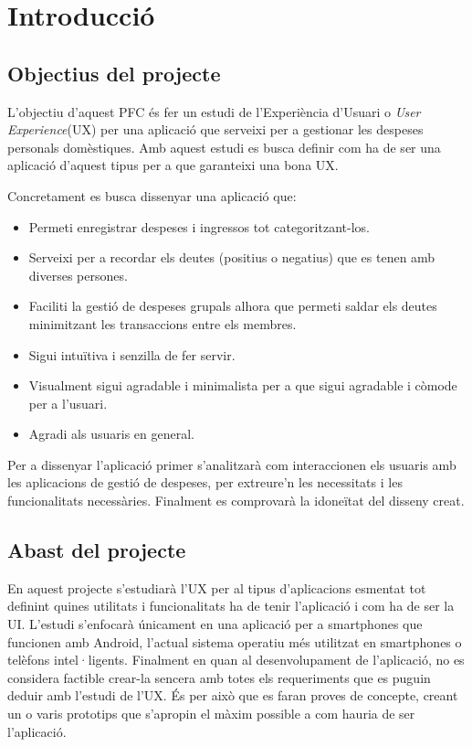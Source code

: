\chapter{Introducció}

\section{Objectius del projecte}
L'objectiu d'aquest \ac{PFC} és fer un estudi de l'Experiència d'Usuari o \textit{User Experience}(UX) per una aplicació que serveixi per a gestionar les despeses personals domèstiques. Amb aquest estudi es busca definir com ha de ser una aplicació d'aquest tipus per a que garanteixi una bona \ac{UX}.

Concretament es busca dissenyar una aplicació que:
\begin{itemize}
\item Permeti enregistrar despeses i ingressos tot categoritzant-los.
\item Serveixi per a recordar els deutes (positius o negatius) que es tenen amb diverses persones.
\item Faciliti la gestió de despeses grupals alhora que permeti saldar els deutes minimitzant les transaccions entre els membres.
\item Sigui intuïtiva i senzilla de fer servir.
\item Visualment sigui agradable i minimalista per a que sigui agradable i còmode per a l'usuari.
\item Agradi als usuaris en general.
\end{itemize}

Per a dissenyar l'aplicació primer s'analitzarà com interaccionen els usuaris amb les aplicacions de gestió de despeses, per extreure'n les necessitats i les funcionalitats necessàries. Finalment es comprovarà la idoneïtat del disseny creat.

\section{Abast del projecte}
En aquest projecte s'estudiarà l'\ac{UX} per al tipus d'aplicacions esmentat tot definint quines utilitats i funcionalitats ha de tenir l'aplicació i com ha de ser la \ac{UI}. L'estudi s'enfocarà únicament en una aplicació per a \glspl{smartphone} que funcionen amb \gls{Android}, l'actual sistema operatiu més utilitzat\cite{Android_OS} en \glspl{smartphone} o telèfons intel·ligents. 
Finalment en quan al desenvolupament de l'aplicació, no es considera factible crear-la sencera amb totes els requeriments que es puguin deduir amb l'estudi de l'\ac{UX}. És per això que es faran proves de concepte, creant un o varis prototips que s'apropin el màxim possible a com hauria de ser l'aplicació. 
